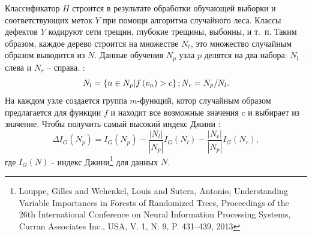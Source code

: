 Классификатор $H$ строится в результате обработки обучающей выборки и соответствующих меток $Y$ при помощи алгоритма случайного леса. Классы дефектов $Y$ кодируют сети трещин, глубокие трещины, выбоины, и т.~п. Таким образом, каждое дерево строится на множестве $N_t$, это множество случайным образом выводится из $N$. Данные обучения $N_p$ узла $p$ делятся на два набора: $N_l$ -- слева и $N_r$ -- справа. :
\begin{equation}\label{eq11}
N_l = \left\{n \in N_p | f\left(v_n\right) > c\right\};  \\
N_r=N_p / N_l.
\end{equation}
На каждом узле создается группа $m$-функций, котор случайным образом предлагается для функции $ f $ и находит все возможные значения $ c $ и  выбирает из  значение. Чтобы получить самый высокий индекс Джини :
\begin{equation}\label{eq12}
\Delta I_G\left(N_p\right)=I_G\left(N_p\right) - \frac{|N_l|}{|N_p|}I_G\left(N_l\right) - \frac{|N_r|}{|N_p|}I_G\left(N_r\right),
\end{equation} где $I_G\left(N\right)$ - индекс Джини\footnote {Louppe, Gilles and Wehenkel, Louis and Sutera, Antonio, Understanding Variable Importances in Forests of Randomized Trees, Proceedings of the 26th International Conference on Neural Information Processing Systems, Curran Associates Inc., USA, V. 1, N. 9, P. 431--439, 2013} для данных  $N$.


